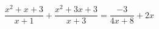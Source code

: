 \begin{ex}[type=equation]
	\begin{condition}
		$\dfrac{x^2 + x + 3}{x + 1} + \dfrac{x^2 + 3x + 3}{x + 3} = \dfrac{-3}{4x + 8} + 2x$
	\end{condition}
\end{ex}